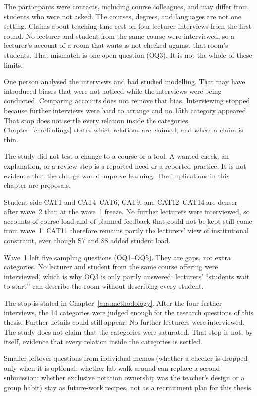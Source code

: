 The participants were contacts, including course colleagues, and may differ from students who were not asked. The courses, degrees, and languages are not one setting. Claims about teaching time rest on four lecturer interviews from the first round. No lecturer and student from the same course were interviewed, so a lecturer's account of a room that waits is not checked against that room's students. That mismatch is one open question (OQ3). It is not the whole of these limits.

One person analysed the interviews and had studied modelling. That may have introduced biases that were not noticed while the interviews were being conducted. Comparing accounts does not remove that bias. Interviewing stopped because further interviews were hard to arrange and no 15th category appeared. That stop does not settle every relation inside the categories. Chapter~\ref{cha:findings} states which relations are claimed, and where a claim is thin.

The study did not test a change to a course or a tool. A wanted check, an explanation, or a review step is a reported need or a reported practice. It is not evidence that the change would improve learning. The implications in this chapter are proposals.

Student-side CAT1 and CAT4--CAT6, CAT9, and CAT12--CAT14 are denser after wave~2 than at the wave~1 freeze. No further lecturers were interviewed, so accounts of course load and of planned feedback that could not be kept still come from wave~1. CAT11 therefore remains partly the lecturers' view of institutional constraint, even though S7 and S8 added student load.

Wave~1 left five sampling questions (OQ1--OQ5). They are gaps, not extra categories. No lecturer and student from the same course offering were interviewed, which is why OQ3 is only partly answered: lecturers' ``students wait to start'' can describe the room without describing every student.

The stop is stated in Chapter~\ref{cha:methodology}. After the four further interviews, the 14 categories were judged enough for the research questions of this thesis. Further details could still appear. No further lecturers were interviewed. The study does not claim that the categories were saturated. That stop is not, by itself, evidence that every relation inside the categories is settled.

Smaller leftover questions from individual memos (whether a checker is dropped only when it is optional; whether lab walk-around can replace a second submission; whether exclusive notation ownership was the teacher's design or a group habit) stay as future-work recipes, not as a recruitment plan for this thesis.


